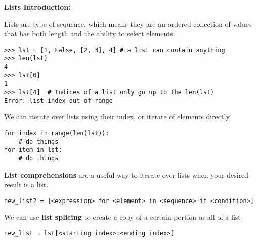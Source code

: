 \textbf{Lists Introduction:}

Lists are type of sequence, which means they are an ordered collection of values that has both length and the ability to select elements. 

\begin{lstlisting} 
>>> lst = [1, False, [2, 3], 4] # a list can contain anything
>>> len(lst) 	
4
>>> lst[0] 	
1
>>> lst[4] 	# Indices of a list only go up to the len(lst)
Error: list index out of range
\end{lstlisting}

We can iterate over lists using their index, or iterate of elements directly

\begin{lstlisting}
for index in range(len(lst)):
	# do things
for item in lst:
	# do things
\end{lstlisting}

\textbf{List comprehensions} are a useful way to iterate over lists when your desired result is a list.
\begin{lstlisting}
new_list2 = [<expression> for <element> in <sequence> if <condition>]
\end{lstlisting}

We can use \textbf{list splicing} to create a copy of a certain portion or all of a list 

\begin{lstlisting}
new_list = lst[<starting index>:<ending index>]
\end{lstlisting}


